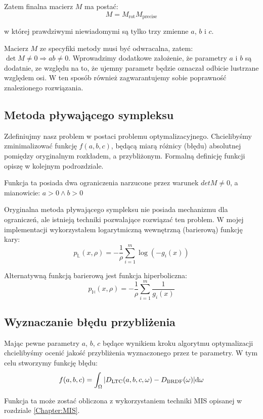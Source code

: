 \documentclass[../main.tex]{subfiles}
\begin{document}
Zatem finalna macierz $M$ ma postać:
\[
M = M_{\text{rot}} M_{\text{precise}}
\]

w której prawdziwymi niewiadomymi są tylko trzy zmienne $a$, $b$ i $c$.

Macierz $M$ ze specyfiki metody musi być odwracalna, zatem:
  $\det M \neq 0 \Rightarrow ab \neq 0$.
Wprowadzimy dodatkowe założenie, że parametry $a$ i $b$ są dodatnie, ze względu
na to, że ujemny parametr będzie oznaczał odbicie lustrzane względem osi.
W ten sposób również zagwarantujemy sobie poprawność znalezionego rozwiązania.

\subsection{Metoda pływającego sympleksu}

Zdefiniujmy nasz problem w postaci problemu optymalizacyjnego. Chcielibyśmy
zminimalizować funkcję $f(a,b,c)$, będącą miarą różnicy (błędu) absolutnej
pomiędzy oryginalnym rozkładem, a przybliżonym. Formalną definicję funkcji
opiszę w kolejnym podrozdziale.

Funkcja ta posiada dwa ograniczenia narzucone przez warunek $detM \neq 0$,
a mianowicie:
  $a > 0 \wedge b > 0$

Oryginalna metoda pływającego sympleksu nie posiada mechanizmu dla ograniczeń,
ale istnieją techniki pozwalające rozwiązać ten problem. W mojej implementacji
wykorzystałem logarytmiczną wewnętrzną (barierową) funkcję kary:
\[
  p_{\mathbb{L}}(x, \rho) = - \frac{1}{\rho} \sum_{i=1}^{m} \log(-g_i(x))
\]

Alternatywną funkcją barierową jest funkcja hiperboliczna:
\[
  p_{\mathbb{H}}(x, \rho) =
    - \frac{1}{\rho} \sum_{i=1}^{m} \frac{1}{g_i(x)}
\]

\subsection{Wyznaczanie błędu przybliżenia}

Mając pewne parametry $a$, $b$, $c$ będące wynikiem kroku algorytmu optymalizacji
chcielibyśmy ocenić jakość przybliżenia wyznaczonego przez te parametry. W tym
celu stworzymy funkcję błędu:
\[
  f(a,b,c) =
    \int_{\Omega} {
      \abs{
        {D_{\text{LTC}}(a, b, c, \omega) - D_{\text{BRDF}}(\omega)}
      }
    } \dd \omega
\]

Funkcja ta może zostać obliczona z wykorzystaniem techniki MIS opisanej w
rozdziale \ref{Chapter:MIS}.
\end{document}
